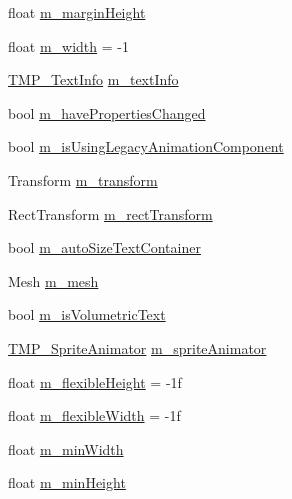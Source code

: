 \begin{DoxyCompactItemize}
\item 
float \mbox{\hyperlink{class_t_m_pro_1_1_t_m_p___text_a75d366197e57cada6b6924c5bf7de253}{m\+\_\+margin\+Height}}
\item 
float \mbox{\hyperlink{class_t_m_pro_1_1_t_m_p___text_ac3e220c987a26f47489667bee3cef006}{m\+\_\+width}} = -\/1
\item 
\mbox{\hyperlink{class_t_m_pro_1_1_t_m_p___text_info}{T\+M\+P\+\_\+\+Text\+Info}} \mbox{\hyperlink{class_t_m_pro_1_1_t_m_p___text_a3bc9e1a599f73d83064bf7df2dc8d28f}{m\+\_\+text\+Info}}
\item 
bool \mbox{\hyperlink{class_t_m_pro_1_1_t_m_p___text_abc4e41157b32183b99e81d20bb22f202}{m\+\_\+have\+Properties\+Changed}}
\item 
bool \mbox{\hyperlink{class_t_m_pro_1_1_t_m_p___text_ab1912fec0152143e58511310a04fb3b4}{m\+\_\+is\+Using\+Legacy\+Animation\+Component}}
\item 
Transform \mbox{\hyperlink{class_t_m_pro_1_1_t_m_p___text_a64c0db455fa77f0ccf651c86dd899873}{m\+\_\+transform}}
\item 
Rect\+Transform \mbox{\hyperlink{class_t_m_pro_1_1_t_m_p___text_a26d3663fd6e3157d928a1547eac6c934}{m\+\_\+rect\+Transform}}
\item 
bool \mbox{\hyperlink{class_t_m_pro_1_1_t_m_p___text_a3b3ed7177868425db486dfbfb1284ac4}{m\+\_\+auto\+Size\+Text\+Container}}
\item 
Mesh \mbox{\hyperlink{class_t_m_pro_1_1_t_m_p___text_a2634df4faa242342271cb5d6e8fe534f}{m\+\_\+mesh}}
\item 
bool \mbox{\hyperlink{class_t_m_pro_1_1_t_m_p___text_af1e26f048dab0af42a0a26ad788f0e8f}{m\+\_\+is\+Volumetric\+Text}}
\item 
\mbox{\hyperlink{class_t_m_pro_1_1_t_m_p___sprite_animator}{T\+M\+P\+\_\+\+Sprite\+Animator}} \mbox{\hyperlink{class_t_m_pro_1_1_t_m_p___text_a919389e828791f5ec8c50ff3780ebd34}{m\+\_\+sprite\+Animator}}
\item 
float \mbox{\hyperlink{class_t_m_pro_1_1_t_m_p___text_a7dac1591424f801dc0bdb61f8aa26385}{m\+\_\+flexible\+Height}} = -\/1f
\item 
float \mbox{\hyperlink{class_t_m_pro_1_1_t_m_p___text_a44d0727be4afbc3f539fb93faf9e6e7a}{m\+\_\+flexible\+Width}} = -\/1f
\item 
float \mbox{\hyperlink{class_t_m_pro_1_1_t_m_p___text_a072a0d978f0d07c4b910d4f814c25003}{m\+\_\+min\+Width}}
\item 
float \mbox{\hyperlink{class_t_m_pro_1_1_t_m_p___text_a79e401e1285af252d061b5187219b674}{m\+\_\+min\+Height}}

\end{DoxyCompactItemize}
